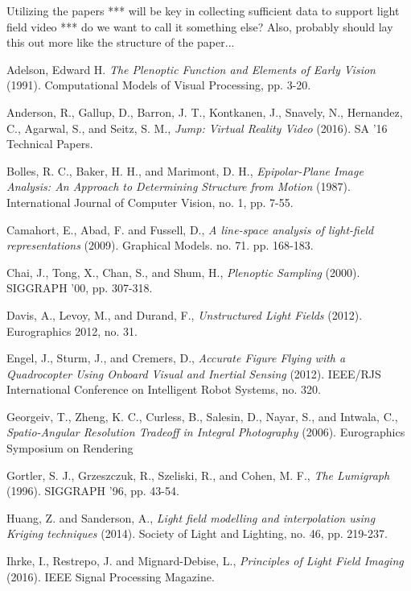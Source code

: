 \documentclass[12pt]{report}
\begin{document}
Utilizing the papers *** will be key in collecting sufficient data to support light field video *** do we want to call it something else? Also, probably should lay this out more like the structure of the paper...


\begin{thebibliography}{10}%

	Adelson, Edward H. \emph{The Plenoptic Function and Elements of Early Vision} (1991). Computational Models of Visual Processing, pp. 3-20.

	Anderson, R., Gallup, D., Barron, J. T., Kontkanen, J., Snavely,  N., Hernandez, C., Agarwal, S., and Seitz, S. M., \emph{Jump: Virtual Reality Video} (2016). SA '16 Technical Papers.

	Bolles, R. C., Baker, H. H., and Marimont, D. H., \emph{Epipolar-Plane Image Analysis: An Approach to Determining Structure from Motion} (1987). International Journal of Computer Vision, no. 1, pp. 7-55. 

	Camahort, E., Abad, F. and Fussell, D., \emph{A line-space analysis of light-field representations} (2009). Graphical Models. no. 71. pp. 168-183.

	Chai, J., Tong, X., Chan, S., and Shum, H., \emph{Plenoptic Sampling} (2000). SIGGRAPH '00, pp. 307-318.

	Davis, A., Levoy, M., and Durand, F., \emph{Unstructured Light Fields} (2012). Eurographics 2012, no. 31.

	Engel, J., Sturm, J., and Cremers, D., \emph{Accurate Figure Flying with a Quadrocopter Using Onboard Visual and Inertial Sensing} (2012). IEEE/RJS International Conference on Intelligent Robot Systems, no. 320.

	Georgeiv, T., Zheng, K. C., Curless, B., Salesin, D., Nayar, S., and Intwala, C., \emph{Spatio-Angular Resolution Tradeoff in Integral Photography} (2006). Eurographics Symposium on Rendering

	Gortler, S. J., Grzeszczuk, R., Szeliski, R., and Cohen, M. F., \emph{The Lumigraph} (1996). SIGGRAPH '96, pp. 43-54.
	
	Huang, Z. and Sanderson, A., \emph{Light field modelling and interpolation using Kriging techniques}	(2014). Society of Light and Lighting, no. 46, pp. 219-237.
	
	Ihrke, I., Restrepo, J. and Mignard-Debise, L., \emph{Principles of Light Field Imaging} (2016). IEEE Signal Processing Magazine.
	

\end{thebibliography}
\end{document}
